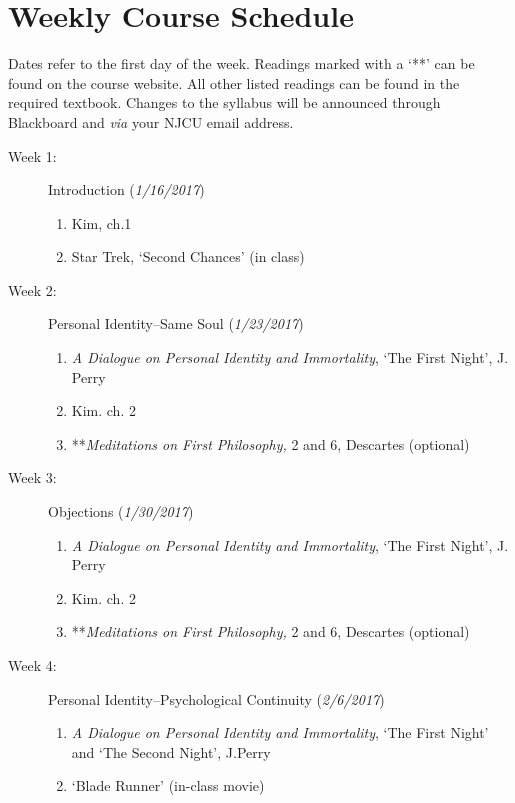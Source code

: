 \documentclass[article,oneside]{memoir}
\begin{document}
\section{Weekly Course Schedule}
Dates refer to the first day of the week. Readings marked with a `**' can be found on the course website. All other listed readings can be found in the required textbook. Changes to the syllabus will be announced through Blackboard and \emph{via} your NJCU email address. \newline





\begin{description}

\item[Week 1: ] Introduction (\emph{1/16/2017})
\begin{enumerate}
\item Kim, ch.1
\item Star Trek, `Second Chances' (in class)  
\end{enumerate}

\item[Week 2:]  Personal Identity--Same Soul (\emph{1/23/2017})
\begin{enumerate}
\item \emph{A Dialogue on Personal Identity and Immortality}, `The First Night', J. Perry  
\item Kim. ch. 2
\item**\emph{Meditations on First Philosophy,} 2 and 6,  Descartes (optional)
\end{enumerate}


\item[Week 3:]  Objections (\emph{1/30/2017})
\begin{enumerate}
\item  \emph{A Dialogue on Personal Identity and Immortality}, `The First Night', J. Perry
\item Kim. ch. 2
\item**\emph{Meditations on First Philosophy,} 2 and 6, Descartes (optional)
\end{enumerate}


\item[Week 4: ] Personal Identity--Psychological Continuity (\emph{2/6/2017})
\begin{enumerate}
\item \emph{A Dialogue on Personal Identity and Immortality}, `The First Night' and `The Second Night', J.Perry
\item `Blade Runner' (in-class movie)
\end{enumerate}


\end{description}
\end{document}
